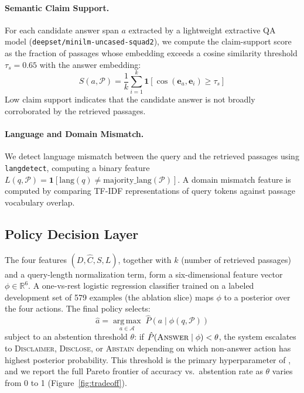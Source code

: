 \paragraph{Semantic Claim Support.}
For each candidate answer span $a$ extracted by a lightweight extractive QA model (\texttt{deepset/minilm-uncased-squad2}), we compute the claim-support score as the fraction of passages whose embedding exceeds a cosine similarity threshold $\tau_s = 0.65$ with the answer embedding:
\begin{equation}
S(a, \mathcal{P}) = \frac{1}{k} \sum_{i=1}^{k} \mathbf{1}[\cos(\mathbf{e}_{a}, \mathbf{e}_i) \geq \tau_s]
\end{equation}
Low claim support indicates that the candidate answer is not broadly corroborated by the retrieved passages.

\paragraph{Language and Domain Mismatch.}
We detect language mismatch between the query and the retrieved passages using \texttt{langdetect}, computing a binary feature $L(q, \mathcal{P}) = \mathbf{1}[\text{lang}(q) \neq \text{majority\_lang}(\mathcal{P})]$. A domain mismatch feature is computed by comparing TF-IDF representations of query tokens against passage vocabulary overlap.

\subsection{Policy Decision Layer}

The four features $(D, \hat{C}, S, L)$, together with $k$ (number of retrieved passages) and a query-length normalization term, form a six-dimensional feature vector $\phi \in \mathbb{R}^6$. A one-vs-rest logistic regression classifier trained on a labeled development set of 579 examples (the ablation slice) maps $\phi$ to a posterior over the four actions. The final policy selects:
\begin{equation}
\hat{a} = \operatorname*{arg\,max}_{a \in \mathcal{A}} \; \hat{P}(a \mid \phi(q, \mathcal{P}))
\end{equation}
subject to an abstention threshold $\theta$: if $\hat{P}(\textsc{Answer} \mid \phi) < \theta$, the system escalates to \textsc{Disclaimer}, \textsc{Disclose}, or \textsc{Abstain} depending on which non-answer action has highest posterior probability. This threshold is the primary hyperparameter of \method{}, and we report the full Pareto frontier of accuracy vs.\ abstention rate as $\theta$ varies from 0 to 1 (Figure~\ref{fig:tradeoff}).

